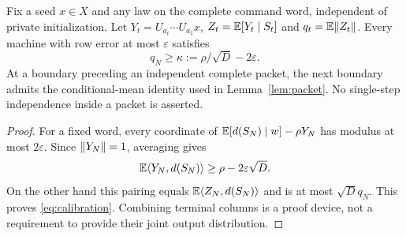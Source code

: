 \begin{lemma}\label{lem:calibration}
Fix a seed $x\in X$ and any law on the complete command word, independent of private initialization. Let $Y_t=U_{a_t}\cdots U_{a_1}x$, $Z_t=\mathbb E[Y_t\mid S_t]$ and $q_t=\mathbb E\lVert Z_t\rVert$. Every machine with row error at most $\varepsilon$ satisfies
\begin{equation}\label{eq:calibration}
 q_N\ge\kappa:=\rho/\sqrt D-2\varepsilon.
\end{equation}
At a boundary preceding an independent complete packet, the next boundary admits the conditional-mean identity used in Lemma~\ref{lem:packet}. No single-step independence inside a packet is asserted.
\end{lemma}
\begin{proof}
For a fixed word, every coordinate of $\mathbb E[d(S_N)\mid w]-\rho Y_N$ has modulus at most $2\varepsilon$. Since $\lVert Y_N\rVert=1$, averaging gives
\[
 \mathbb E\langle Y_N,d(S_N)\rangle\ge\rho-2\varepsilon\sqrt D.
\]
On the other hand this pairing equals $\mathbb E\langle Z_N,d(S_N)\rangle$ and is at most $\sqrt D q_N$. This proves \eqref{eq:calibration}. Combining terminal columns is a proof device, not a requirement to provide their joint output distribution.
\end{proof}
